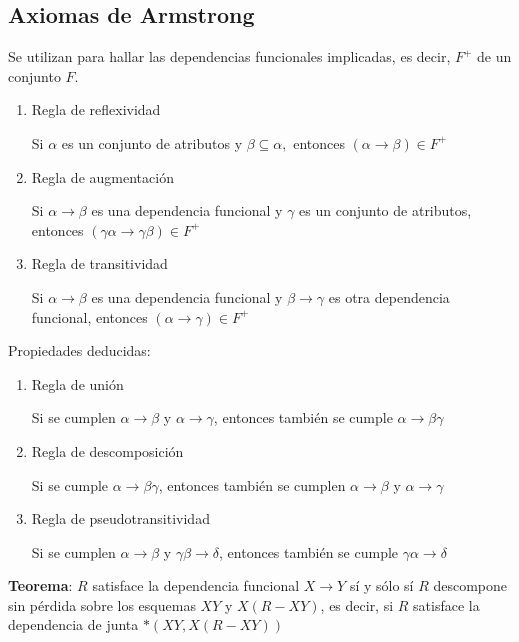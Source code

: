 \documentclass[a4paper, twoside]{article}
\begin{document}
\subsection{Axiomas de Armstrong}
Se utilizan para hallar las dependencias funcionales implicadas, es
decir, $F^{+}$ de un conjunto $F$.
\begin{enumerate}
\item Regla de reflexividad


Si $\alpha$ es un conjunto de atributos y $\beta\subseteq\alpha,$
entonces $(\alpha\to\beta)\in F^{+}$

\item Regla de augmentación


Si $\alpha\to\beta$ es una dependencia funcional y $\gamma$ es un
conjunto de atributos, entonces $(\gamma\alpha\to\gamma\beta)\in F^{+}$

\item Regla de transitividad


Si $\alpha\to\beta$ es una dependencia funcional y $\beta\to\gamma$
es otra dependencia funcional, entonces $(\alpha\to\gamma)\in F^{+}$

\end{enumerate}
Propiedades deducidas:
\begin{enumerate}
\item Regla de unión


Si se cumplen $\alpha\to\beta$ y $\alpha\to\gamma$, entonces también
se cumple $\alpha\to\beta\gamma$

\item Regla de descomposición


Si se cumple $\alpha\to\beta\gamma$, entonces también se cumplen
$\alpha\to\beta$ y $\alpha\to\gamma$

\item Regla de pseudotransitividad


Si se cumplen $\alpha\to\beta$ y $\gamma\beta\to\delta$, entonces
también se cumple $\gamma\alpha\to\delta$

\end{enumerate}
\textbf{Teorema}: $R$ satisface la dependencia funcional $X\to Y$
sí y sólo sí $R$ descompone sin pérdida sobre los esquemas $XY$
y $X(R-XY)$, es decir, si $R$ satisface la dependencia de junta
$*\left(XY,X(R-XY)\right)$
\end{document}
